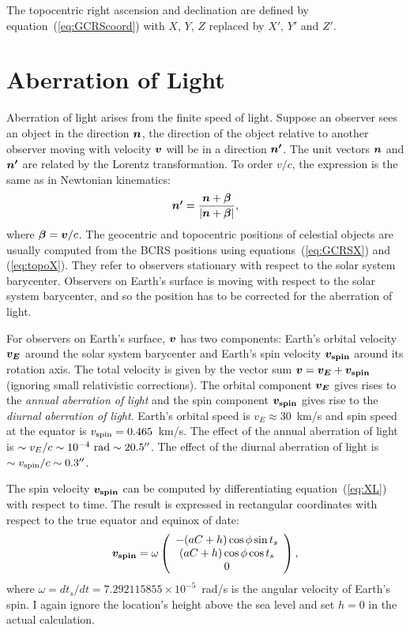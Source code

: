 \documentclass[12pt]{article}
\newcommand \beq {\begin{equation}}
\newcommand \eeq {\end{equation}}
\newcommand{\ve}[1]{\mbox{\boldmath $#1$}}
\begin{document}
The topocentric right ascension and declination are defined by 
equation~(\ref{eq:GCRScoord}) with $X$, $Y$, $Z$ replaced by $X'$, $Y'$ and 
$Z'$.

\section{Aberration of Light} 

Aberration of light arises from the finite speed of light. Suppose an observer 
sees an object in the direction $\ve{n}$, the direction of the object 
relative to another observer moving with velocity $\ve{v}$ will be in 
a direction $\ve{n'}$. The unit vectors $\ve{n}$ and $\ve{n'}$ are related 
by the Lorentz transformation. To order $v/c$, the expression is the same as 
in Newtonian kinematics:
\beq
  \ve{n'} = \frac{\ve{n} + \ve{\beta}}{|\ve{n} + \ve{\beta}|} ,
\label{eq:aberration}
\eeq
where $\ve{\beta} = \ve{v}/c$. The geocentric and topocentric positions 
of celestial objects are usually computed from the BCRS positions 
using equations~(\ref{eq:GCRSX}) and (\ref{eq:topoX}). They refer 
to observers stationary with respect to the solar system barycenter. 
Observers on Earth's surface is moving with respect to the solar system barycenter, 
and so the position has to be corrected for the aberration of light. 

For observers on Earth's surface, $\ve{v}$ has two components: Earth's 
orbital velocity $\ve{v_E}$ around the solar system barycenter 
and Earth's spin velocity $\ve{v_{\rm spin}}$ around its rotation axis. 
The total velocity is given by the vector sum 
$\ve{v}=\ve{v_E} + \ve{v_{\rm spin}}$ (ignoring small relativistic 
corrections). The orbital component $\ve{v_E}$ gives rises to the 
{\em annual aberration of light} and the spin component $\ve{v_{\rm spin}}$ 
gives rise to the {\em diurnal aberration of light}. Earth's orbital 
speed is $v_E \approx 30$~km/s and spin speed at the equator is 
$v_{\rm spin}=0.465$~km/s. The effect of the annual aberration of light is 
$\sim v_E/c \sim 10^{-4}~{\rm rad}\sim 20.5''$. The effect of the 
diurnal aberration of light is $\sim v_{\rm spin}/c \sim 0.3''$.

The spin velocity $\ve{v_{\rm spin}}$ can be computed by differentiating 
equation~(\ref{eq:XL}) with respect to time. The result is expressed 
in rectangular coordinates with respect to the true equator and equinox of date:
\beq
  \ve{v_{\rm spin}} = \omega \left( \begin{array}{c} 
 -(aC +h) \cos \phi \sin t_s \\ (aC+h) \cos \phi \cos t_s \\ 0 \end{array} \right) ,
\label{eq:vspin}
\eeq
where $\omega=dt_s/dt = 7.292115855\times 10^{-5}$~rad/s is the angular velocity 
of Earth's spin. I again ignore the location's height above the sea level and 
set $h=0$ in the actual calculation. 
\end{document}
